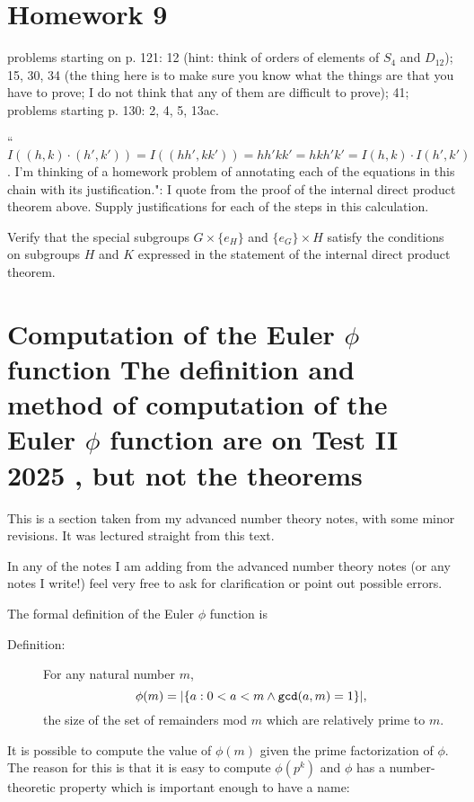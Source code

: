 \documentclass[12pt]{article}
\begin{document}
\section{Homework 9}

problems starting on p. 121:  12 (hint:  think of orders of elements of $S_4$ and $D_{12}$);  15, 30, 34 (the thing here is to make sure you know what the things are that you have to prove;  I do not think that any of them are difficult to prove);  41;  problems starting p. 130:  2, 4, 5, 13ac.   

``$I((h,k)\cdot(h',k')) = I((hh',kk')) = hh'kk' = hkh'k' = I(h,k)\cdot I(h',k')$.  I'm thinking of a homework problem of annotating each of the equations in this chain with its justification.":  I quote from the proof of the internal direct product theorem above.  Supply justifications for each of the steps in this calculation.

Verify that the special subgroups $G \times \{e_H\}$ and $\{e_G\} \times H$ satisfy the conditions on subgroups $H$ and $K$ expressed in the statement of the internal direct product theorem.

\section{Computation of the Euler $\phi$ function  The definition and method of computation of the Euler $\phi$ function are on Test II 2025 , but not the theorems}

This is a section taken from my advanced number theory notes, with some minor revisions.  It was lectured straight from this text.

In any of the notes I am adding from the advanced number theory notes (or any notes I write!) feel very free to ask for clarification or point out possible errors.

The formal definition of the Euler $\phi$ function is

\begin{description}

\item[Definition:]  For any natural number $m$, $$\phi(m)=|\{a : 0<a<m \wedge {\tt gcd}(a,m)=1\}|,$$ the size of the set of remainders mod $m$ which are relatively prime to $m$.

\end{description}

It is possible to compute the value of $\phi(m)$ given the prime factorization of $\phi$.   The reason for this is that it is easy to compute $\phi(p^k)$ and $\phi$ has a number-theoretic property which is important enough to have a name:
\end{document}

